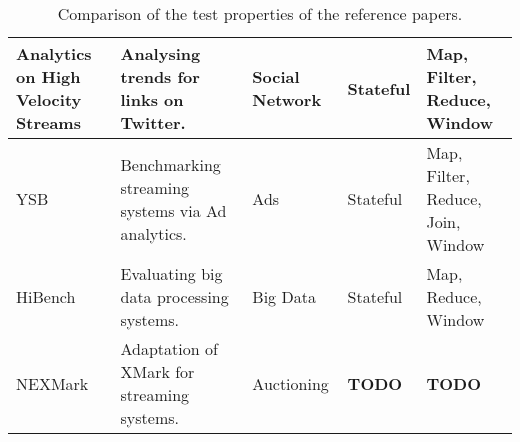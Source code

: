 \begin{table}[H]
{\begin{tabular}{|p{3cm}|p{4cm}|p{3cm}|p{2.5cm}|p{2.5cm}|}
      Analytics on High Velocity Streams\cite{storm2}
      & Analysing trends for links on Twitter.
      & Social Network
      & Stateful
      & Map, Filter, Reduce, Window
      \\\hline

      YSB\cite{ysb}
      & Benchmarking streaming systems via Ad analytics.
      & Ads
      & Stateful
      & Map, Filter, Reduce, Join, Window
      \\\hline

      HiBench\cite{hibench}
      & Evaluating big data processing systems.
      & Big Data
      & Stateful
      & Map, Reduce, Window
      \\\hline

      NEXMark\cite{nexmark}
      & Adaptation of XMark for streaming systems.
      & Auctioning
      & {\bfseries TODO}
      & {\bfseries TODO}
      \\\hline
    \end{tabular}
  }
  \caption{Comparison of the test properties of the reference papers.}
  \label{table:test-properties}
\end{table}

